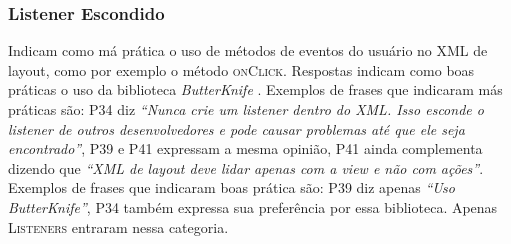 \subsubsection{Listener Escondido}
Indicam como má prática o uso de métodos de eventos do usuário no XML de layout, como por exemplo o método \textsc{onClick}. Respostas indicam como boas práticas o uso da biblioteca \textit{ButterKnife} \cite{ButterKnife}. Exemplos de frases que indicaram más práticas são: P34 diz \textit{``Nunca crie um listener dentro do XML. Isso esconde o listener de outros desenvolvedores e pode causar problemas até que ele seja encontrado''}, P39 e P41 expressam a mesma opinião, P41 ainda complementa dizendo que \textit{``XML de layout deve lidar apenas com a view e não com ações''}. Exemplos de frases que indicaram boas prática são: P39 diz apenas \textit{``Uso ButterKnife''}, P34 também expressa sua preferência por essa biblioteca. Apenas \textsc{Listeners} entraram nessa categoria.










